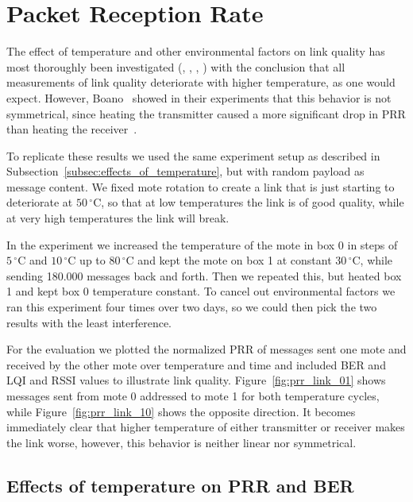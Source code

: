 \section{Packet Reception Rate}
\label{sec:packet_reception_rate}

The effect of temperature and other environmental factors on link quality has most thoroughly been investigated (\cite{Wennerstrom2013}, \cite{Boano2013}, \cite{Boano2014}, \cite{Zuniga2013}) with the conclusion that all measurements of link quality deteriorate with higher temperature, as one would expect.
However, Boano~\etal{} showed in their experiments that this behavior is not symmetrical, since heating the transmitter caused a more significant drop in \ac{PRR} than heating the receiver~\cite{Boano2013}.

To replicate these results we used the same experiment setup as described in Subsection~\ref{subsec:effects_of_temperature}, but with random payload as message content.
We fixed mote rotation to create a link that is just starting to deteriorate at $50\,^{\circ}\mathrm{C}$, so that at low temperatures the link is of good quality, while at very high temperatures the link will break.

In the experiment we increased the temperature of the mote in box 0 in steps of $5\,^{\circ}\mathrm{C}$ and $10\,^{\circ}\mathrm{C}$ up to $80\,^{\circ}\mathrm{C}$ and kept the mote on box 1 at constant $30\,^{\circ}\mathrm{C}$, while sending 180.000 messages back and forth.
Then we repeated this, but heated box 1 and kept box 0 temperature constant.
To cancel out environmental factors we ran this experiment four times over two days, so we could then pick the two results with the least interference.

For the evaluation we plotted the normalized \ac{PRR} of messages sent one mote and received by the other mote over temperature and time and included \ac{BER} and \ac{LQI} and \ac{RSSI} values to illustrate link quality.
Figure~\ref{fig:prr_link_01} shows messages sent from mote 0 addressed to mote 1 for both temperature cycles, while Figure~\ref{fig:prr_link_10} shows the opposite direction.
It becomes immediately clear that higher temperature of either transmitter or receiver makes the link worse, however, this behavior is neither linear nor symmetrical.

\subsection{Effects of temperature on \acs{PRR} and \acs{BER}}

